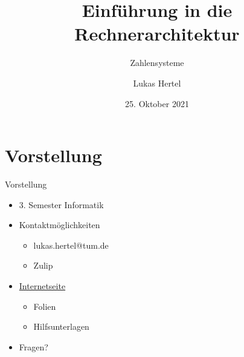 \documentclass[
  german,            %
  aspectratio=169,    %
  sectionpage=false,   %
]{tumbeamer}
\title{Einführung in die Rechnerarchitektur}
\subtitle{Zahlensysteme}
\author{Lukas Hertel}
\institute{\theChairName\\\theDepartmentName\\\theUniversityName}
\date[25.10.2021]{25. Oktober 2021}
\begin{document}
\maketitle

\section{Vorstellung}
\begin{frame}{Vorstellung}
  \begin{itemize}
    \item 3. Semester Informatik
    \item Kontaktmöglichkeiten
    \begin{itemize}
        \item lukas.hertel@tum.de
        \item Zulip
    \end{itemize}
    \item \href{https://era.lukas-hertel.de}{Internetseite}
    \begin{itemize}
    	\item Folien
    	\item Hilfsunterlagen
    \end{itemize}
	\item Fragen?
  \end{itemize}
\end{frame}
\end{document}
